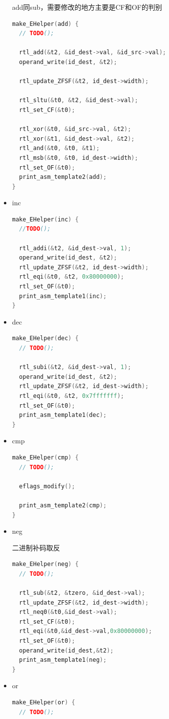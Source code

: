 \documentclass[UTF8,a4paper,10pt]{ctexart}
\begin{document}
\begin{itemize}
add同sub，需要修改的地方主要是CF和OF的判别
\begin{lstlisting}[language = C]
  make_EHelper(add) {
  // TODO();

  rtl_add(&t2, &id_dest->val, &id_src->val);
  operand_write(id_dest, &t2);

  rtl_update_ZFSF(&t2, id_dest->width);

  rtl_sltu(&t0, &t2, &id_dest->val);
  rtl_set_CF(&t0);

  rtl_xor(&t0, &id_src->val, &t2);
  rtl_xor(&t1, &id_dest->val, &t2);
  rtl_and(&t0, &t0, &t1);
  rtl_msb(&t0, &t0, id_dest->width);
  rtl_set_OF(&t0);
  print_asm_template2(add);
}
\end{lstlisting}
\item inc 
\begin{lstlisting}[language = C]
  make_EHelper(inc) {
  //TODO();

  rtl_addi(&t2, &id_dest->val, 1);
  operand_write(id_dest, &t2);
  rtl_update_ZFSF(&t2, id_dest->width);
  rtl_eqi(&t0, &t2, 0x80000000);
  rtl_set_OF(&t0);
  print_asm_template1(inc);
}
\end{lstlisting}
\item dec
\begin{lstlisting}[language = C]
  make_EHelper(dec) {
  // TODO();

  rtl_subi(&t2, &id_dest->val, 1);
  operand_write(id_dest, &t2);
  rtl_update_ZFSF(&t2, id_dest->width);
  rtl_eqi(&t0, &t2, 0x7fffffff);
  rtl_set_OF(&t0);
  print_asm_template1(dec);
}
\end{lstlisting}
\item cmp
\begin{lstlisting}[language = C]
  make_EHelper(cmp) {
  // TODO();

  eflags_modify();

  print_asm_template2(cmp);
}
\end{lstlisting}
\item neg

二进制补码取反
\begin{lstlisting}[language = C]
make_EHelper(neg) {
  // TODO();

  rtl_sub(&t2, &tzero, &id_dest->val);
  rtl_update_ZFSF(&t2, id_dest->width);
  rtl_neq0(&t0,&id_dest->val);
  rtl_set_CF(&t0);
  rtl_eqi(&t0,&id_dest->val,0x80000000);
  rtl_set_OF(&t0);
  operand_write(id_dest,&t2);
  print_asm_template1(neg);
}
\end{lstlisting}
\item or 
\begin{lstlisting}[language = C]
make_EHelper(or) {
  // TODO();


\end{lstlisting}
\end{itemize}
\end{document}
